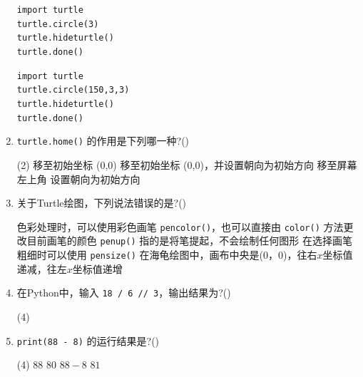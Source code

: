 \documentclass[11pt]{ctexart}
\begin{document}
\begin{enumerate}
\begin{tasks}
            \task 
            \lstinline!import turtle! \\ 
            \lstinline!turtle.circle(3)! \\
            \lstinline!turtle.hideturtle()! \\
            \lstinline!turtle.done()!

            \task \lstinline!import turtle! \\ 
            \lstinline!turtle.circle(150,3,3)! \\
            \lstinline!turtle.hideturtle()! \\
            \lstinline!turtle.done()!
        \end{tasks}

        \item \lstinline{turtle.home()} 的作用是下列哪一种?(\qquad)
        \begin{tasks}(2)
            \task 移至初始坐标 (0,0)
            \task 移至初始坐标 (0,0)，并设置朝向为初始方向
            \task 移至屏幕左上角
            \task 设置朝向为初始方向
        \end{tasks}

        \item 关于Turtle绘图，下列说法错误的是?(\qquad)
        \begin{tasks}
            \task 色彩处理时，可以使用彩色画笔 \lstinline{pencolor()}，也可以直接由 \lstinline{color()} 方法更改目前画笔的颜色
            \task \lstinline{penup()} 指的是将笔提起，不会绘制任何图形
            \task 在选择画笔粗细时可以使用 \lstinline{pensize()}
            \task 在海龟绘图中，画布中央是(0，0)，往右$x$坐标值递减，往左$x$坐标值递增
        \end{tasks}

        \item  在Python中，输入 \lstinline!18 / 6 // 3!，输出结果为?(\qquad)
        \begin{tasks}(4)
        \end{tasks}

        \item \lstinline!print(88 - 8)! 的运行结果是?(\qquad)
        \begin{tasks}(4)
            \task $88$
            \task $80$
            \task $88-8$
            \task $81$
        \end{tasks}
        

\end{enumerate}
\end{document}
